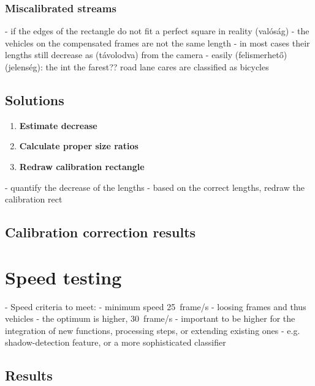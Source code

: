 \subsubsection{Miscalibrated streams}
- if the edges of the rectangle do not fit a perfect square in reality (valóság)
- the vehicles on the compensated frames are not the same length
- in most cases their lengths still decrease as (távolodva) from the camera
- easily (felismerhető) (jelenség): the int the farest?? road lane cares are classified as bicycles

\subsection{Solutions}
\begin{enumerate}
	\item  \textbf{Estimate decrease}
	\item  \textbf{Calculate proper size ratios}
	\item  \textbf{Redraw calibration rectangle}
\end{enumerate}
- quantify the decrease of the lengths
- based on the correct lengths, redraw the calibration rect

\subsection{Calibration correction results}

\section{Speed testing}
- Speed criteria to meet:
	- minimum speed \SI{25}{frame/s}
	- loosing frames and thus vehicles
	- the optimum is higher, \SI{30}{frame/s}
	- important to be higher for the integration of new functions, processing steps, or extending existing ones
	- e.g. shadow-detection feature, or a more sophisticated classifier

\subsection{Results}
